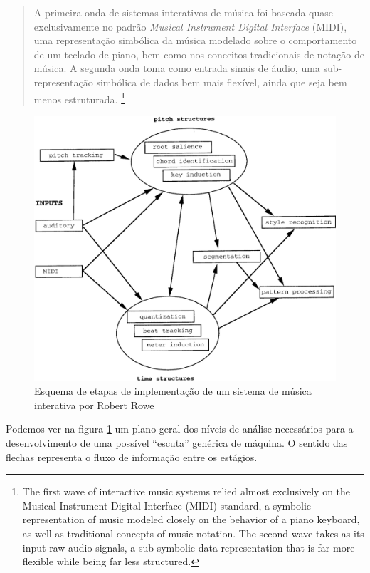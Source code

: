 \documentclass{ppgmus}
\begin{document}
\begin{quote}
A primeira onda de sistemas interativos de música foi baseada quase exclusivamente no padrão \textit{Musical
Instrument Digital Interface} (MIDI), uma representação simbólica da música modelado
sobre o comportamento de um teclado de piano, bem como nos conceitos tradicionais de notação de música.
A segunda onda toma como entrada sinais de áudio, uma sub-representação simbólica de dados bem mais flexível, 
ainda que seja bem menos estruturada. \cite{rowe09:levels}
\footnote{The first wave of interactive music systems relied almost exclusively on the Musical 
Instrument Digital Interface (MIDI) standard, a symbolic representation of music modeled 
closely on the behavior of a piano keyboard, as well as traditional concepts of music notation. 
The second wave takes as its input raw audio signals, a sub-symbolic data representation that is far 
more flexible while being far less structured.}
\end{quote}


\begin{figure}
\includegraphics[scale=.25]{rowe}
\caption{Esquema de etapas de implementação de um sistema de música interativa por Robert Rowe}
\label{rowe}
\end{figure} 


Podemos ver na figura \ref{rowe} um plano geral dos níveis de análise necessários para a desenvolvimento
de uma possível ``escuta'' genérica de máquina. O sentido das flechas representa o fluxo de 
informação entre os estágios.
\end{document}
